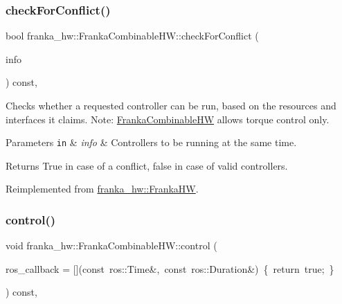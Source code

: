 \subsubsection{\texorpdfstring{check\+For\+Conflict()}{checkForConflict()}}
{\footnotesize\ttfamily bool franka\+\_\+hw\+::\+Franka\+Combinable\+H\+W\+::check\+For\+Conflict (\begin{DoxyParamCaption}\item[{const std\+::list$<$ hardware\+\_\+interface\+::\+Controller\+Info $>$ \&}]{info }\end{DoxyParamCaption}) const\hspace{0.3cm}{\ttfamily [override]}, {\ttfamily [virtual]}}

Checks whether a requested controller can be run, based on the resources and interfaces it claims. Note\+: \hyperlink{classfranka__hw_1_1_franka_combinable_h_w}{Franka\+Combinable\+HW} allows torque control only.


\begin{DoxyParams}[1]{Parameters}
\mbox{\tt in}  & {\em info} & Controllers to be running at the same time.\\
\hline
\end{DoxyParams}
\begin{DoxyReturn}{Returns}
True in case of a conflict, false in case of valid controllers. 
\end{DoxyReturn}


Reimplemented from \hyperlink{classfranka__hw_1_1_franka_h_w_a73e581982455acacca51d81e4676e9a6}{franka\+\_\+hw\+::\+Franka\+HW}.

\mbox{\label{classfranka__hw_1_1_franka_combinable_h_w_a07855d935d7063930be9aa140d0895f8}} 
\subsubsection{\texorpdfstring{control()}{control()}}
{\footnotesize\ttfamily void franka\+\_\+hw\+::\+Franka\+Combinable\+H\+W\+::control (\begin{DoxyParamCaption}\item[{const std\+::function$<$ bool(const ros\+::\+Time \&, const ros\+::\+Duration \&)$>$ \&}]{ros\+\_\+callback = {\ttfamily \mbox{[}\mbox{]}(const~ros\+:\+:Time\&,~const~ros\+:\+:Duration\&)~\{~return~true;~\}} }\end{DoxyParamCaption}) const\hspace{0.3cm}{\ttfamily [override]}, {\ttfamily [virtual]}}

